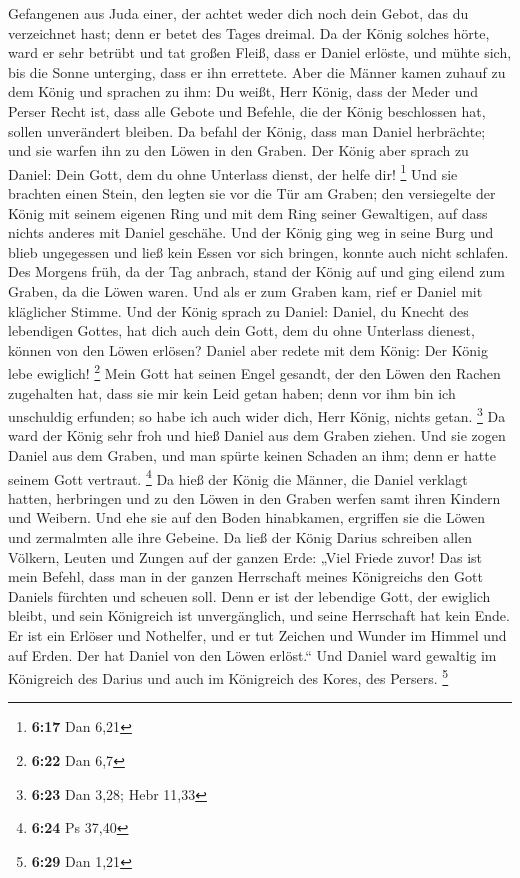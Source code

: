 Gefangenen aus Juda einer, der achtet weder dich noch dein Gebot, das du
verzeichnet hast; denn er betet des Tages dreimal.  Da
der König solches hörte, ward er sehr betrübt und tat großen Fleiß, dass
er Daniel erlöste, und mühte sich, bis die Sonne unterging, dass er ihn
errettete.  Aber die Männer kamen zuhauf zu dem König und
sprachen zu ihm: Du weißt, Herr König, dass der Meder und Perser Recht
ist, dass alle Gebote und Befehle, die der König beschlossen hat, sollen
unverändert bleiben.  Da befahl der König, dass man
Daniel herbrächte; und sie warfen ihn zu den Löwen in den Graben. Der
König aber sprach zu Daniel: Dein Gott, dem du ohne Unterlass dienst,
der helfe dir! \footnote{\textbf{6:17} Dan 6,21}  Und sie
brachten einen Stein, den legten sie vor die Tür am Graben; den
versiegelte der König mit seinem eigenen Ring und mit dem Ring seiner
Gewaltigen, auf dass nichts anderes mit Daniel geschähe. 
Und der König ging weg in seine Burg und blieb ungegessen und ließ kein
Essen vor sich bringen, konnte auch nicht schlafen.  Des
Morgens früh, da der Tag anbrach, stand der König auf und ging eilend
zum Graben, da die Löwen waren.  Und als er zum Graben
kam, rief er Daniel mit kläglicher Stimme. Und der König sprach zu
Daniel: Daniel, du Knecht des lebendigen Gottes, hat dich auch dein
Gott, dem du ohne Unterlass dienest, können von den Löwen erlösen?
 Daniel aber redete mit dem König: Der König lebe
ewiglich! \footnote{\textbf{6:22} Dan 6,7}  Mein Gott hat
seinen Engel gesandt, der den Löwen den Rachen zugehalten hat, dass sie
mir kein Leid getan haben; denn vor ihm bin ich unschuldig erfunden; so
habe ich auch wider dich, Herr König, nichts getan. \footnote{\textbf{6:23}
  Dan 3,28; Hebr 11,33}  Da ward der König sehr froh und
hieß Daniel aus dem Graben ziehen. Und sie zogen Daniel aus dem Graben,
und man spürte keinen Schaden an ihm; denn er hatte seinem Gott
vertraut. \footnote{\textbf{6:24} Ps 37,40}  Da hieß der
König die Männer, die Daniel verklagt hatten, herbringen und zu den
Löwen in den Graben werfen samt ihren Kindern und Weibern. Und ehe sie
auf den Boden hinabkamen, ergriffen sie die Löwen und zermalmten alle
ihre Gebeine.  Da ließ der König Darius schreiben allen
Völkern, Leuten und Zungen auf der ganzen Erde: „Viel Friede zuvor!
 Das ist mein Befehl, dass man in der ganzen Herrschaft
meines Königreichs den Gott Daniels fürchten und scheuen soll. Denn er
ist der lebendige Gott, der ewiglich bleibt, und sein Königreich ist
unvergänglich, und seine Herrschaft hat kein Ende.  Er
ist ein Erlöser und Nothelfer, und er tut Zeichen und Wunder im Himmel
und auf Erden. Der hat Daniel von den Löwen erlöst.`` 
Und Daniel ward gewaltig im Königreich des Darius und auch im Königreich
des Kores, des Persers. \footnote{\textbf{6:29} Dan 1,21}

